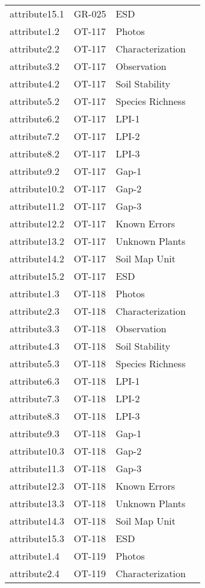 \documentclass[
]{article}
\begin{document}
\begin{longtable}[]{@{}llll@{}}
attribute15.1 & GR-025 & ESD & \\
attribute1.2 & OT-117 & Photos & \\
attribute2.2 & OT-117 & Characterization & \\
attribute3.2 & OT-117 & Observation & \\
attribute4.2 & OT-117 & Soil Stability & \\
attribute5.2 & OT-117 & Species Richness & \\
attribute6.2 & OT-117 & LPI-1 & \\
attribute7.2 & OT-117 & LPI-2 & \\
attribute8.2 & OT-117 & LPI-3 & \\
attribute9.2 & OT-117 & Gap-1 & \\
attribute10.2 & OT-117 & Gap-2 & \\
attribute11.2 & OT-117 & Gap-3 & \\
attribute12.2 & OT-117 & Known Errors & \\
attribute13.2 & OT-117 & Unknown Plants & \\
attribute14.2 & OT-117 & Soil Map Unit & \\
attribute15.2 & OT-117 & ESD & \\
attribute1.3 & OT-118 & Photos & \\
attribute2.3 & OT-118 & Characterization & \\
attribute3.3 & OT-118 & Observation & \\
attribute4.3 & OT-118 & Soil Stability & \\
attribute5.3 & OT-118 & Species Richness & \\
attribute6.3 & OT-118 & LPI-1 & \\
attribute7.3 & OT-118 & LPI-2 & \\
attribute8.3 & OT-118 & LPI-3 & \\
attribute9.3 & OT-118 & Gap-1 & \\
attribute10.3 & OT-118 & Gap-2 & \\
attribute11.3 & OT-118 & Gap-3 & \\
attribute12.3 & OT-118 & Known Errors & \\
attribute13.3 & OT-118 & Unknown Plants & \\
attribute14.3 & OT-118 & Soil Map Unit & \\
attribute15.3 & OT-118 & ESD & \\
attribute1.4 & OT-119 & Photos & \\
attribute2.4 & OT-119 & Characterization & \\

\end{longtable}
\end{document}
